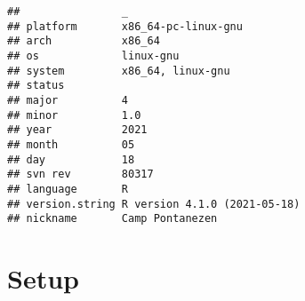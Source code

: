 \documentclass[]{book}
\begin{document}
\begin{verbatim}
##                _                           
## platform       x86_64-pc-linux-gnu         
## arch           x86_64                      
## os             linux-gnu                   
## system         x86_64, linux-gnu           
## status                                     
## major          4                           
## minor          1.0                         
## year           2021                        
## month          05                          
## day            18                          
## svn rev        80317                       
## language       R                           
## version.string R version 4.1.0 (2021-05-18)
## nickname       Camp Pontanezen
\end{verbatim}

\hypertarget{setup-4}{%
\section{Setup}\label{setup-4}}
\end{document}

